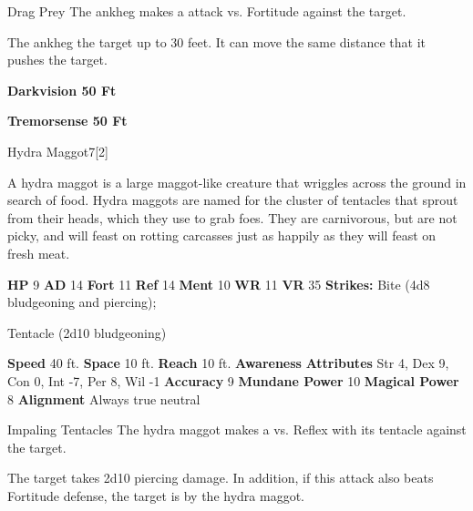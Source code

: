     \begin{freeability}{Drag Prey}
       The ankheg makes a  attack
        vs. Fortitude against the target.
    
    \hit The ankheg  the target up to 30 feet.
          It can move the same distance that it pushes the target.
    \end{freeability}
  
      \par \textbf{Darkvision 50 Ft}
    \par \textbf{Tremorsense 50 Ft}
  
  \begin{monsection}{Hydra Maggot}{7}[2]
    \vspace{-1em}\vspace{-1em}
    \vspace{0em}

    
      A hydra maggot is a large maggot-like creature that wriggles across the ground in search of food.
      Hydra maggots are named for the cluster of tentacles that sprout from their heads, which they use to grab foes.
      They are carnivorous, but are not picky, and will feast on rotting carcasses just as happily as they will feast on fresh meat.
    
    

    \begin{spellcontent}
      \begin{spelltargetinginfo}
        \pari \textbf{HP} 9 \monsep
          \textbf{AD} 14 \monsep
          \textbf{Fort} 11 \monsep
          \textbf{Ref} 14 \monsep
          \textbf{Ment} 10
        \pari \textbf{WR} 11 \monsep
        \textbf{VR} 35
        \pari \textbf{Strikes:}
            Bite  (4d8 bludgeoning and piercing);
\par Tentacle  (2d10 bludgeoning)
      \end{spelltargetinginfo}
    \end{spellcontent}
    \begin{monsterfooter}
      \pari \textbf{Speed} 40 ft. \monsep
        \textbf{Space} 10 ft. \monsep
        \textbf{Reach} 10 ft.
      \pari \textbf{Awareness} 
      \pari \textbf{Attributes}
        Str 4, Dex 9,
        Con 0, Int -7,
        Per 8, Wil -1
      \pari \textbf{Accuracy} 9 \monsep
        \textbf{Mundane Power} 10 \monsep
      \textbf{Magical Power} 8
      \pari \textbf{Alignment} Always true neutral
    \end{monsterfooter}
  \end{monsection}
  \begin{freeability}{Impaling Tentacles}
       The hydra maggot makes a 
         vs. Reflex
        with its tentacle against the target.
    
    \hit 
          The target takes 2d10 piercing damage.
          In addition, if this attack also beats Fortitude defense, the target is  by the hydra maggot.
    \end{freeability}
  
